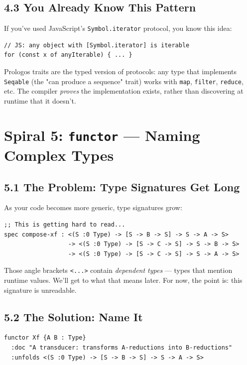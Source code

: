\documentclass[11pt]{article}
\begin{document}
\subsection{4.3 You Already Know This Pattern}
\label{sec:org11a12f0}

If you've used JavaScript's \texttt{Symbol.iterator} protocol, you know this idea:

\begin{verbatim}
// JS: any object with [Symbol.iterator] is iterable
for (const x of anyIterable) { ... }
\end{verbatim}

Prologos traits are the typed version of protocols: any type that
implements \texttt{Seqable} (the "can produce a sequence" trait) works with
\texttt{map}, \texttt{filter}, \texttt{reduce}, etc. The compiler \emph{proves} the implementation
exists, rather than discovering at runtime that it doesn't.
\section{Spiral 5: \texttt{functor} --- Naming Complex Types}
\label{sec:org4a11eb2}

\subsection{5.1 The Problem: Type Signatures Get Long}
\label{sec:orgdbcedd1}

As your code becomes more generic, type signatures grow:

\begin{verbatim}
;; This is getting hard to read...
spec compose-xf : <(S :0 Type) -> [S -> B -> S] -> S -> A -> S>
                  -> <(S :0 Type) -> [S -> C -> S] -> S -> B -> S>
                  -> <(S :0 Type) -> [S -> C -> S] -> S -> A -> S>
\end{verbatim}

Those angle brackets \texttt{<...>} contain \emph{dependent types} --- types that
mention runtime values. We'll get to what that means later. For now,
the point is: this signature is unreadable.
\subsection{5.2 The Solution: Name It}
\label{sec:org93dfe4e}

\begin{verbatim}
functor Xf {A B : Type}
  :doc "A transducer: transforms A-reductions into B-reductions"
  :unfolds <(S :0 Type) -> [S -> B -> S] -> S -> A -> S>
\end{verbatim}
\end{document}
